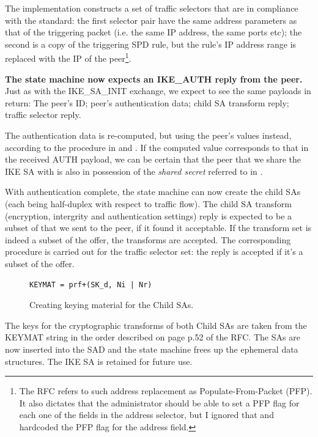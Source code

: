\documentclass[final,a4paper,twoside,11pt,onecolumn]{report}
\begin{document}
The implementation constructs a set of traffic selectors that are in compliance with the standard: the first selector pair have the same address parameters as that of the triggering packet (i.e. the same IP address, the same ports etc); the second is a copy of the triggering SPD rule, but the rule's IP address range is replaced with the IP of the peer\footnote{The RFC refers to such address replacement as Populate-From-Packet (PFP). It also dictates that the administrator should be able to set a PFP flag for each one of the fields in the address selector, but I ignored that and hardcoded the PFP flag for the address field.}.


\textbf{The state machine now expects an IKE\_AUTH reply from the peer.} Just as with the IKE\_SA\_INIT exchange, we expect to see the same payloads in return: The peer's ID; peer's authentication data; child SA transform reply; traffic selector reply.

The authentication data is re-computed, but using the peer's values instead, according to the procedure in  and . If the computed value corresponds to that in the received AUTH payload, we can be certain that the peer that we share the IKE SA with is also in possession of the \emph{shared secret} referred to in .

With authentication complete, the state machine can now create the child SAs (each being half-duplex with respect to traffic flow). The child SA transform (encryption, intergrity and authentication settings) reply is expected to be a subset of that we sent to the peer, if it found it acceptable. If the transform set is indeed a subset of the offer, the transforms are accepted. The corresponding procedure is carried out for the traffic selector set: the reply is accepted if it's a subset of the offer.

\begin{figure}[h]
\centering
\begin{verbatim}
KEYMAT = prf+(SK_d, Ni | Nr)
\end{verbatim}
\label{fig:child-keymat}
\caption{Creating keying material for the Child SAs.}
\end{figure}

The keys for the cryptographic transforms of both Child SAs are taken from the KEYMAT string in the order described on page p.52 of the RFC. The SAs are now inserted into the SAD and the state machine frees up the ephemeral data structures. The IKE SA is retained for future use.
\end{document}
